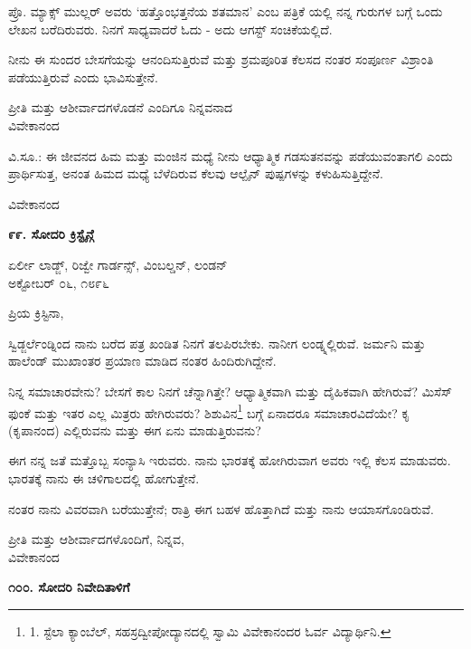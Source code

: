 ಪ್ರೊ. ಮ್ಯಾಕ್ಸ್ ಮುಲ್ಲರ್ ಅವರು ‘ಹತ್ತೊಂಭತ್ತನೆಯ ಶತಮಾನ’ ಎಂಬ ಪತ್ರಿಕೆ ಯಲ್ಲಿ ನನ್ನ ಗುರುಗಳ ಬಗ್ಗೆ ಒಂದು ಲೇಖನ ಬರೆದಿರುವರು. ನಿನಗೆ ಸಾಧ್ಯವಾದರೆ ಓದು - ಅದು ಆಗಸ್ಟ್ ಸಂಚಿಕೆಯಲ್ಲಿದೆ.

ನೀನು ಈ ಸುಂದರ ಬೇಸಗೆಯನ್ನು ಆನಂದಿಸುತ್ತಿರುವೆ ಮತ್ತು ಶ್ರಮಪೂರಿತ ಕೆಲಸದ ನಂತರ ಸಂಪೂರ್ಣ ವಿಶ್ರಾಂತಿ ಪಡೆಯುತ್ತಿರುವೆ ಎಂದು ಭಾವಿಸುತ್ತೇನೆ.

\begin{flushright}
ಪ್ರೀತಿ ಮತ್ತು ಆಶೀರ್ವಾದಗಳೊಡನೆ ಎಂದಿಗೂ ನಿನ್ನವನಾದ\\ವಿವೇಕಾನಂದ
\end{flushright}

ವಿ.ಸೂ.: ಈ ಜೀವನದ ಹಿಮ ಮತ್ತು ಮಂಜಿನ ಮಧ್ಯೆ ನೀನು ಆಧ್ಯಾತ್ಮಿಕ ಗಡಸುತನವನ್ನು ಪಡೆಯುವಂತಾಗಲಿ ಎಂದು ಪ್ರಾರ್ಥಿಸುತ್ತ, ಅನಂತ ಹಿಮದ ಮಧ್ಯೆ ಬೆಳೆದಿರುವ ಕೆಲವು ಆಲ್ಪೈನ್ ಪುಷ್ಪಗಳನ್ನು ಕಳುಹಿಸುತ್ತಿದ್ದೇನೆ.

\begin{flushright}
ವಿವೇಕಾನಂದ
\end{flushright}

\begin{center}
\textbf{೯೯. ಸೋದರಿ ಕ್ರಿಸ್ಟೈನ್ಗೆ}
\end{center}

\begin{flushright}
ಏರ್ಲೀ ಲಾಡ್ಜ್, ರಿಜ್ವೇ ಗಾರ್ಡನ್ಸ್, ವಿಂಬಲ್ಡನ್, ಲಂಡನ್\\ಅಕ್ಟೋಬರ್ ೦೬, ೧೮೯೬
\end{flushright}

ಪ್ರಿಯ ಕ್ರಿಸ್ಟಿನಾ,

ಸ್ವಿಡ್ಜರ್ಲೆಂಡ್ನಿಂದ ನಾನು ಬರೆದ ಪತ್ರ ಖಂಡಿತ ನಿನಗೆ ತಲಪಿರಬೇಕು. ನಾನೀಗ ಲಂಡ್ನ್ನಲ್ಲಿರುವೆ. ಜರ್ಮನಿ ಮತ್ತು ಹಾಲೆಂಡ್ ಮುಖಾಂತರ ಪ್ರಯಾಣ ಮಾಡಿದ ನಂತರ ಹಿಂದಿರುಗಿದ್ದೇನೆ.

ನಿನ್ನ ಸಮಾಚಾರವೇನು? ಬೇಸಗೆ ಕಾಲ ನಿನಗೆ ಚೆನ್ನಾಗಿತ್ತೇ? ಆಧ್ಯಾತ್ಮಿಕವಾಗಿ ಮತ್ತು ದೈಹಿಕವಾಗಿ ಹೇಗಿರುವೆ? ಮಿಸೆಸ್ ಫುಂಕೆ ಮತ್ತು ಇತರ ಎಲ್ಲ ಮಿತ್ರರು ಹೇಗಿರುವರು? ಶಿಶುವಿನ\footnote{1. ಸ್ಟೆಲಾ ಕ್ಯಾಂಬೆಲ್, ಸಹಸ್ರದ್ವೀಪೋದ್ಯಾನದಲ್ಲಿ ಸ್ವಾಮಿ ವಿವೇಕಾನಂದರ ಓರ್ವ ವಿದ್ಯಾರ್ಥಿನಿ.} ಬಗ್ಗೆ ಏನಾದರೂ ಸಮಾಚಾರವಿದೆಯೇ? ಕೃ (ಕೃಪಾನಂದ) ಎಲ್ಲಿರುವನು ಮತ್ತು ಈಗ ಏನು ಮಾಡುತ್ತಿರುವನು?

ಈಗ ನನ್ನ ಜತೆ ಮತ್ತೊಬ್ಬ ಸಂನ್ಯಾಸಿ ಇರುವರು. ನಾನು ಭಾರತಕ್ಕೆ ಹೋಗಿರುವಾಗ ಅವರು ಇಲ್ಲಿ ಕೆಲಸ ಮಾಡುವರು. ಭಾರತಕ್ಕೆ ನಾನು ಈ ಚಳಿಗಾಲದಲ್ಲಿ ಹೋಗುತ್ತೇನೆ.

ನಂತರ ನಾನು ವಿವರವಾಗಿ ಬರೆಯುತ್ತೇನೆ; ರಾತ್ರಿ ಈಗ ಬಹಳ ಹೊತ್ತಾಗಿದೆ ಮತ್ತು ನಾನು ಆಯಾಸಗೊಂಡಿರುವೆ.

\begin{flushright}
ಪ್ರೀತಿ ಮತ್ತು ಆಶೀರ್ವಾದಗಳೊಂದಿಗೆ, ನಿನ್ನವ,\\ವಿವೇಕಾನಂದ
\end{flushright}

\begin{center}
\textbf{೧೦೦. ಸೋದರಿ ನಿವೇದಿತಾಳಿಗೆ}
\end{center}

